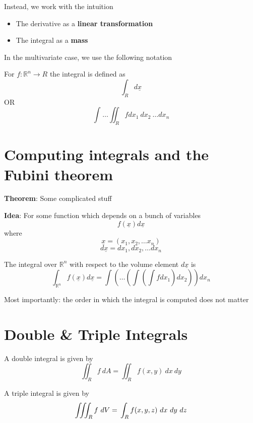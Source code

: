 Instead, we work with the intuition 
\begin{itemize}
   \item The derivative as a \textbf{linear transformation}
   \item The integral as a \textbf{mass} \\
\end{itemize}



In the multivariate case, we use the following notation
\begin{framed}
  For $f: \mathbb{R}^n \rightarrow R$ the integral is defined as
  \[
    \int_{R}^{}  d \underline{x}  
  \] 
  OR
  \[
     \int_{}^{} \hdots \iint_{R} f dx_1\ dx_2\ \hdots dx_n
  \] 
\end{framed}

\section{Computing integrals and the Fubini theorem}

\begin{framed}
   \textbf{Theorem}: Some complicated stuff

   \textbf{Idea}: For some function which depends on a bunch of variables
   \[
     f( \underline{x}) d \underline{x} 
   \]  
   where 
   \[
   \underline{x} = (x_1, x_2,  \hdots x_n)
   \] 
   \[
   d\underline{x} = dx_1, dx_2,  \hdots dx_n
   \] 

   The integral over $ \mathbb{R}^n$ with respect to the volume element $d \underline{x}$ is
   \[
      \int_{ \mathbb{R}^n} f ( \underline{x}) d \underline{x} =
        \int \left( 
           \hdots \left( 
              \int \left( 
                 \int f dx_1
              \right) dx_2
           \right) 
        \right)  dx_n
   \]  

   Most importantly: the order in which the integral is computed does not matter
  
\end{framed}

\section{Double \& Triple Integrals}

\begin{framed}
   A double integral is given by
   \[
      \iint_{R} f\ dA = \iint_{R} f(x,y)\ dx\ dy
   \]  

   A triple integral is given by
   \[
      \iiint_{R} f\ dV = \\\int_{R} f(x, y, z)\ dx\ dy\ dz
   \] 
\end{framed}

